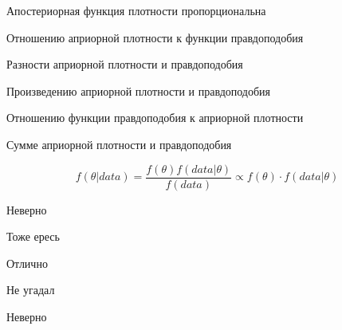 
\begin{question}
Апостериорная функция плотности пропорциональна
\begin{answerlist}
  \item Отношению априорной плотности к функции правдоподобия
  \item Разности априорной плотности и правдоподобия
  \item Произведению априорной плотности и правдоподобия
  \item Отношению функции правдоподобия к априорной плотности
  \item Сумме априорной плотности и правдоподобия
\end{answerlist}
\end{question}

\begin{solution}
\[
f(\theta|data) = \frac{f(\theta)f(data|\theta)}{f(data)}\propto f(\theta) \cdot f(data|\theta)
\]
\begin{answerlist}
  \item Неверно
  \item Тоже ересь
  \item Отлично
  \item Не угадал
  \item Неверно
\end{answerlist}
\end{solution}

